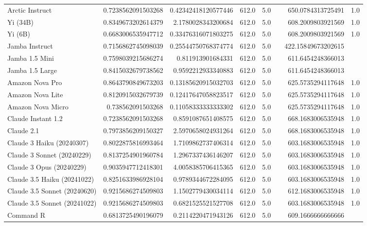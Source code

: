 \begin{table}[htp]
{\begin{tabular}{lrrrrrrr}
Arctic Instruct & 0.7238562091503268 & 0.42342418120577446 & 612.0 & 5.0 &  & 650.0784313725491 & 1.0 \\
Yi (34B) & 0.8349673202614379 & 2.1780028343200684 & 612.0 & 5.0 &  & 608.2009803921569 & 1.0 \\
Yi (6B) & 0.6683006535947712 & 0.33476316071803275 & 612.0 & 5.0 &  & 608.2009803921569 & 1.0 \\
Jamba Instruct & 0.7156862745098039 & 0.25544750768374774 & 612.0 & 5.0 &  & 422.15849673202615 &  \\
Jamba 1.5 Mini & 0.7598039215686274 & 0.811913901684331 & 612.0 & 5.0 &  & 611.6454248366013 &  \\
Jamba 1.5 Large & 0.8415032679738562 & 0.9592212933340883 & 612.0 & 5.0 &  & 611.6454248366013 &  \\
Amazon Nova Pro & 0.8643790849673203 & 0.13185620915032703 & 612.0 & 5.0 &  & 625.5735294117648 & 1.0 \\
Amazon Nova Lite & 0.8120915032679739 & 0.12417647058823517 & 612.0 & 5.0 &  & 625.5735294117648 & 1.0 \\
Amazon Nova Micro & 0.738562091503268 & 0.11058333333333302 & 612.0 & 5.0 &  & 625.5735294117648 & 1.0 \\
Claude Instant 1.2 & 0.7238562091503268 & 0.8591087651408575 & 612.0 & 5.0 &  & 668.1683006535948 & 1.0 \\
Claude 2.1 & 0.7973856209150327 & 2.5970658024931264 & 612.0 & 5.0 &  & 668.1683006535948 & 1.0 \\
Claude 3 Haiku (20240307) & 0.8022875816993464 & 1.7109862737406314 & 612.0 & 5.0 &  & 603.1683006535948 & 1.0 \\
Claude 3 Sonnet (20240229) & 0.8137254901960784 & 1.2967337436146207 & 612.0 & 5.0 &  & 603.1683006535948 & 1.0 \\
Claude 3 Opus (20240229) & 0.9035947712418301 & 4.0058385706415365 & 612.0 & 5.0 &  & 603.1683006535948 & 1.0 \\
Claude 3.5 Haiku (20241022) & 0.8251633986928104 & 0.9789344672284095 & 612.0 & 5.0 &  & 603.1683006535948 & 1.0 \\
Claude 3.5 Sonnet (20240620) & 0.9215686274509803 & 1.1502779430034114 & 612.0 & 5.0 &  & 612.1683006535948 & 1.0 \\
Claude 3.5 Sonnet (20241022) & 0.9215686274509803 & 0.6821525521527708 & 612.0 & 5.0 &  & 603.1683006535948 & 1.0 \\
Command R & 0.6813725490196079 & 0.2114220471943126 & 612.0 & 5.0 &  & 609.1666666666666 &  \\

\end{tabular}}
\end{table}
